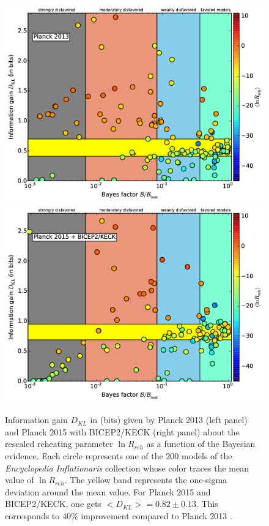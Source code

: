 \documentclass[11pt,a4paper,twoside]{book}
\begin{document}
\begin{figure}[h]
	\centering
	\includegraphics[width=0.75\linewidth, height=0.3\textheight]{Images/Chap3/Martin_Fig3A}
	\includegraphics[width=0.75\linewidth, height=0.3\textheight]{Images/Chap3/Martin_Fig3B}
	\caption{Information gain $ D_{KL} $ in (bits) given by Planck 2013 (left panel) and Planck 2015 with BICEP2/KECK (right panel) about the rescaled reheating parameter $ \ln R_{reh} $ as a function of the Bayesian evidence. Each circle represents one of the 200 models of the \textit{Encyclopedia Inflationaris} collection whose color traces the mean value of $ \ln R_{reh} $. The yellow band represents the one-sigma deviation around the mean value. For Planck 2015 and BICEP2/KECK, one gets $ <D_{KL}> = 0.82 \pm 0.13 $. This corresponds to $ 40\% $ improvement compared to Planck 2013 \cite{Chap3:Martin_Milestone}. } 
	\label{fig:martinfig3a}
\end{figure}
\end{document}
